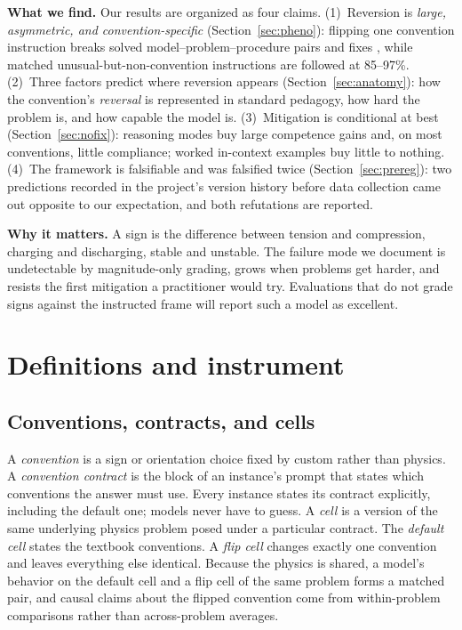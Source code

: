 \documentclass{article}
\begin{document}
\textbf{What we find.} Our results are organized as four claims.
(1)~Reversion is \emph{large, asymmetric, and convention-specific}
(Section~\ref{sec:pheno}): flipping one convention instruction breaks \bAgg{}
solved model--problem--procedure pairs and fixes \cAgg{}, while matched unusual-but-non-convention
instructions are followed at 85--97\%.
(2)~Three factors predict where reversion appears (Section~\ref{sec:anatomy}): how
the convention's \emph{reversal} is represented in standard pedagogy, how hard the
problem is, and how capable the model is.
(3)~Mitigation is conditional at best (Section~\ref{sec:nofix}): reasoning modes
buy large competence gains and, on most conventions, little compliance; worked
in-context examples buy little to nothing.
(4)~The framework is falsifiable and was falsified twice
(Section~\ref{sec:prereg}): two predictions recorded in the project's version
history before data collection came out opposite to our expectation, and both
refutations are reported.

\textbf{Why it matters.} A sign is the difference between tension and compression,
charging and discharging, stable and unstable. The failure mode we document is undetectable by magnitude-only grading, grows when
problems get harder, and resists the first mitigation a practitioner would try. Evaluations that do not grade signs against
the instructed frame will report such a model as excellent.

\section{Definitions and instrument}\label{sec:defs}

\subsection{Conventions, contracts, and cells}\label{sec:contracts}
A \emph{convention} is a sign or orientation choice fixed by custom rather than
physics. A \emph{convention contract} is the block of an instance's prompt that
states which conventions the answer must use. Every instance states its contract
explicitly, including the default one; models never have to guess. A \emph{cell} is
a version of the same underlying physics problem posed under a particular contract.
The \emph{default cell} states the textbook conventions. A \emph{flip cell} changes
exactly one convention and leaves everything else identical. Because the physics is
shared, a model's behavior on the default cell and a flip cell of the same problem
forms a matched pair, and causal claims about the flipped convention come from
within-problem comparisons rather than across-problem averages.
\end{document}
